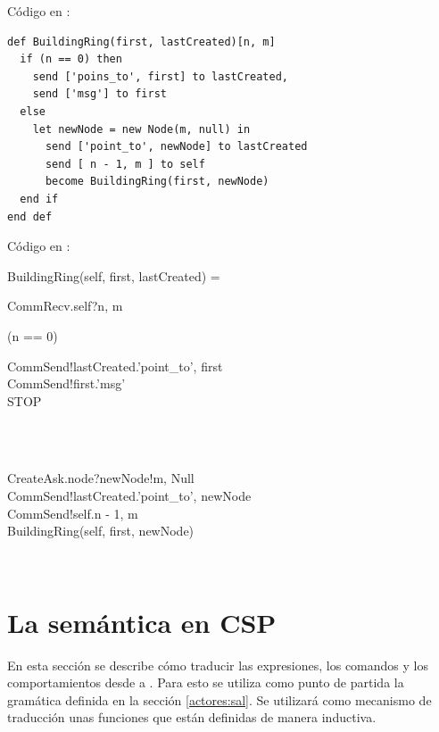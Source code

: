 Código en \SAL:

\begin{lstlisting}[language=sal, style=simple]
def BuildingRing(first, lastCreated)[n, m]
  if (n == 0) then
    send ['poins_to', first] to lastCreated,
    send ['msg'] to first
  else
    let newNode = new Node(m, null) in
      send ['point_to', newNode] to lastCreated
      send [ n - 1, m ] to self
      become BuildingRing(first, newNode)
  end if
end def
\end{lstlisting}

Código en \CSP:

\begin{process}
BuildingRing(self, first, lastCreated) = \\ \quad
  \begin{block}
  CommRecv.self?\langle n, m \rangle \then \\ \quad
  \begin{block} 
  \If (n == 0) \Then {} \\ \quad
    \begin{block}
    CommSend!lastCreated.\langle 'point\_to', first \rangle \then \\
    CommSend!first.\langle 'msg' \rangle \then \\
    STOP
    \end{block} \\
  \Else {} \\ \quad
    \begin{block} 
    CreateAsk.node?newNode!\langle m, Null \rangle \then \\
    CommSend!lastCreated.\langle 'point\_to', newNode \rangle \then \\
    CommSend!self.\langle n - 1, m \rangle \then \\
    BuildingRing(self, first, newNode) 
    \end{block} \\
  \end{block} 
\end{block}
\end{process}

\section{La semántica en CSP}

En esta sección se describe cómo traducir las expresiones, los comandos y los comportamientos desde \SAL a \CSP. Para esto se utiliza como punto de partida la gramática definida en la sección \ref{actores:sal}. Se utilizará como mecanismo de traducción unas funciones que están definidas de manera inductiva.

